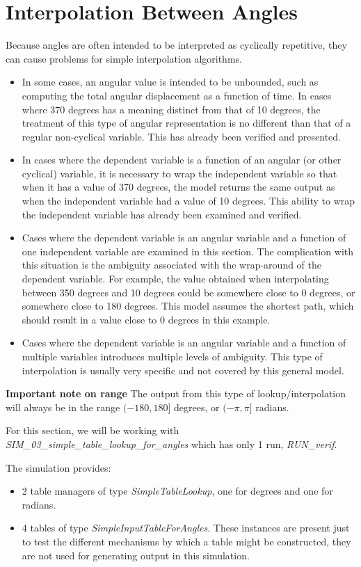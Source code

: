 \documentclass[11pt,fleqn]{report}
\begin{document}
\section {Interpolation Between Angles}
Because angles are often intended to be interpreted as cyclically repetitive,
they can cause problems for simple interpolation algorithms.
\begin{itemize}
\item In some cases,
an angular value is intended to be unbounded, such as computing the total
angular displacement as a function of time. In cases where 370
degrees has a meaning distinct from that of 10 degrees, the treatment of this
type of
angular representation is no different than that of a regular non-cyclical
variable. This has already been verified and presented.
\item In cases where the dependent variable is a function of an angular (or
other cyclical) variable, it is necessary to wrap the independent variable
so that when it has a value of 370 degrees, the model returns the same
output as when the independent variable had a value of 10 degrees.  This
ability to wrap the independent variable has already been examined and
verified.
\item Cases where the dependent variable is an angular variable and a
function of one independent variable are examined in this section.  The
complication with this situation is the ambiguity associated with the
wrap-around of the dependent variable.  For example, the value obtained when
interpolating between 350 degrees and 10 degrees could be somewhere close to
0 degrees, or somewhere close to 180 degrees.  This model assumes the shortest
path, which should result in a value close to 0 degrees in this example.
\item Cases where the dependent variable is an angular variable and a
function of multiple variables introduces multiple levels of ambiguity.
This type of interpolation is usually very specific and not covered by this
general model.
\end{itemize}

\textbf{Important note on range} The output from this type of
lookup/interpolation will
always be in the range $(-180,180]$ degrees, or $(-\pi, \pi]$ radians.

For this section, we will be working with
\textit{SIM\_03\_simple\_table\_lookup\_for\_angles} which has only 1 run,
\textit{RUN\_verif}.


The simulation provides:
\begin{itemize}
  \item 2 table managers of type \textit{SimpleTableLookup}, one for degrees
  and one for radians.
  \item 4 tables of type \textit{SimpleInputTableForAngles}.  These instances
  are present just to test the different mechanisms by which a table might be
  constructed, they are not used for generating output in this simulation.
\end{itemize}
\end{document}
